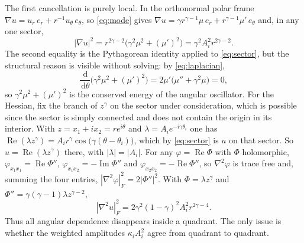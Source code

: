 \documentclass[10pt,pdftex]{amsart}%
\numberwithin{equation}{section}
\newcommand{\dd}{\,\mathrm{d}}
\begin{document}
The first cancellation is purely local.  In the orthonormal polar frame $\nabla u=u_r\,e_r+r^{-1}u_\theta\,e_\theta$, so \eqref{eq:mode} gives $\nabla u=\gamma r^{\gamma-1}\mu\,e_r+r^{\gamma-1}\mu'\,e_\theta$ and, in any one sector,
\begin{equation}\label{eq:sector-gradient}
 |\nabla u|^2
 =r^{2\gamma-2}\bigl(\gamma^2\mu^2+(\mu')^2\bigr)
 =\gamma^2A_i^2r^{2\gamma-2}.
\end{equation}
The second equality is the Pythagorean identity applied to \eqref{eq:sector}, but the structural reason is visible without solving: by \eqref{eq:laplacian},
\begin{equation}\label{eq:conservation}
  \frac{\dd}{\dd\theta}\bigl(\gamma^2\mu^2+(\mu')^2\bigr)
  =2\mu'\bigl(\mu''+\gamma^2\mu\bigr)=0 ,
\end{equation}
so $\gamma^2\mu^2+(\mu')^2$ is the conserved energy of the angular oscillator.  For the Hessian, fix the branch of $z^\gamma$ on the sector under consideration, which is possible since the sector is simply connected and does not contain the origin in its interior.  With $z=x_1+ix_2=re^{i\theta}$ and $\lambda=A_ie^{-i\gamma\theta_i}$ one has $\operatorname{Re}(\lambda z^\gamma)=A_ir^\gamma\cos\bigl(\gamma(\theta-\theta_i)\bigr)$, which by \eqref{eq:sector} is $u$ on that sector.  So $u=\operatorname{Re}(\lambda z^\gamma)$ there, with $|\lambda|=|A_i|$.  For any $\varphi=\operatorname{Re}\Phi$ with $\Phi$ holomorphic, $\varphi_{x_1x_1}=\operatorname{Re}\Phi''$, $\varphi_{x_1x_2}=-\operatorname{Im}\Phi''$ and $\varphi_{x_2x_2}=-\operatorname{Re}\Phi''$, so $\nabla^2\varphi$ is trace free and, summing the four entries, $|\nabla^2\varphi|_F^2=2|\Phi''|^2$.  With $\Phi=\lambda z^\gamma$ and $\Phi''=\gamma(\gamma-1)\lambda z^{\gamma-2}$,
\begin{equation}\label{eq:sector-hessian}
 |\nabla^2u|_F^2
 =2\gamma^2(1-\gamma)^2A_i^2r^{2\gamma-4}.
\end{equation}
Thus all angular dependence disappears inside a quadrant.  The only issue is whether the weighted amplitudes $\kappa_iA_i^2$ agree from quadrant to quadrant.
\end{document}

